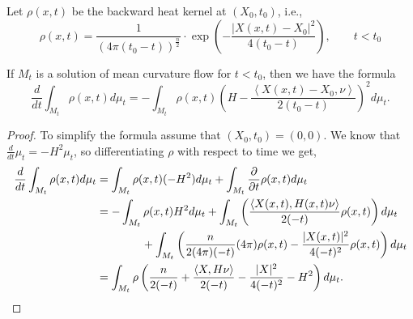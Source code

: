 Let $ \rho(x,t) $ be the backward heat kernel at $ (X_{0},t_{0}) $, i.e.,   \[\rho(x,t) = \frac{1}{(4 \pi (t_{0}-t))^{ \frac{n}{2}} }\cdot \exp\left( - \frac{|X(x,t)-X_{0}|^{2}}{4(t_{0}-t)} \right), \qquad t<t_{0} \]
\begin{thm} \label{Monotonicityformula}
If $ M_{t} $ is a solution of mean curvature flow for $ t< t_{0} $, then we have the formula
    \[ \frac{d}{dt} \int_{M_{t}}\rho(x,t)d \mu_{t}  = - \int_{M_{t}}\rho(x,t)\left( H- \frac{\left< X(x,t)-X_{0}, \nu \right>}{2 (t_{0}-t)} \right)^{2}d \mu_{t}.\] 
\end{thm}
\begin{proof}
To simplify the formula assume that $ \left(X_{0},t_{0}\right) = (0,0) $. We know that $ \frac{d}{dt} \mu_{t} = -H^{2} \mu_{t} $, so differentiating $ \rho $ with respect to time we get,
\begin{align}
    \frac{d}{dt} \int_{M_{t}}\rho(x,t)d \mu_{t}  &= \int_{M_{t}}\rho(x,t)(-H^{2})d \mu_{t} + \int_{M_{t}} \frac{\partial}{\partial t}\rho(x,t)d \mu_{t}\nonumber \\
    & = -\int_{M_{t}}\rho(x,t)H^{2}d \mu_{t} +\int_{M_{t}}\left( \frac{\left< X(x,t), H(x,t)\nu \right>}{2(-t)}\rho(x,t) \right)d\mu_{t}\nonumber \\
    &  \qquad \qquad  + \int_{M_{t}} \left( \frac{n}{2(4 \pi)(-t)}(4 \pi)\rho(x,t) -\frac{|X(x,t)|^{2}}{4(-t)^{2}}\rho(x,t)\right)d \mu_{t}\nonumber \\ 
    & = \int_{M_{t}}\rho\left(   \frac{n}{2(-t)} +\frac{\left< X,H \nu\right>}{2(-t)}- \frac{|X|^{2}}{4(-t)^{2}} -H^{2}\right)d \mu_{t}.\label{rho0}
\end{align}


\end{proof}
